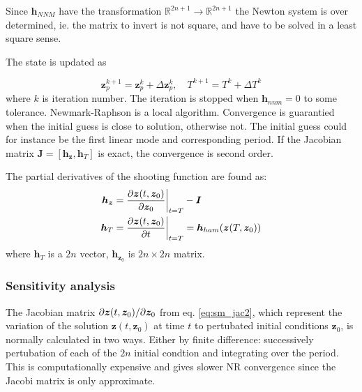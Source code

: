 Since $\bm h_{NNM}$ have the transformation $\mathbb{R}^{2n+1} \rightarrow
\mathbb{R}^{2n+1}$ the Newton system is over determined, ie. the matrix to
invert is not square, and have to be solved in a least square sense.

The state is updated as

\begin{equation}
  \label{eq:sm_nr_update}
  \bm z^{k+1}_{p} = \bm z^k_{p} + \Delta \bm z^k_{p}, \quad
  T^{k+1} = T^k + \Delta T^k
\end{equation}
where $k$ is iteration number. The iteration is stopped when $\bm h_{nnm} = 0$
to some tolerance. Newmark-Raphson is a local algorithm. Convergence is
guarantied when the initial guess is close to solution, otherwise not. The
initial guess could for instance be the first linear mode and corresponding
period. If the Jacobian matrix $\bm J = [\bm h_{\bm z}, \bm h_T] $ is exact, the
convergence is second order.


The partial derivatives of the shooting function are found as:
\begin{align}
  \label{eq:sm_jac1}
  \bm h_{\bm{z}}&=
  \frac{\partial \bm z(t, \bm z_0)}{\partial \bm z_0}\bigg|_{t=T} - \bm I \\
  \bm h_T &=
  \frac{\partial \bm z(t, \bm z_0)}{\partial t}\bigg|_{t=T} =
  \bm h_{ham}(\bm z(T, \bm z_0))
  \label{eq:sm_jac2}
\end{align}
where $\bm h_{T}$ is a $2n$ vector, $\bm h_{\bm z_{0}}$ is $2n\times 2n$ matrix.



\subsubsection{Sensitivity analysis}
\label{sec:sm_sens_ana}

The Jacobian matrix $\partial \bm z(t,\bm z_0) / \partial \bm z_{0}$ from eq.
\eqref{eq:sm_jac2}, which represent the variation of the solution $\bm z(t,\bm
z_0)$ at time $t$ to pertubated initial conditions $\bm z_0$, is normally
calculated in two ways. Either by finite difference: successively pertubation of
each of the $2n$ initial condtion and integrating over the period. This is
computationally expensive and gives slower NR convergence since the Jacobi
matrix is only approximate.

